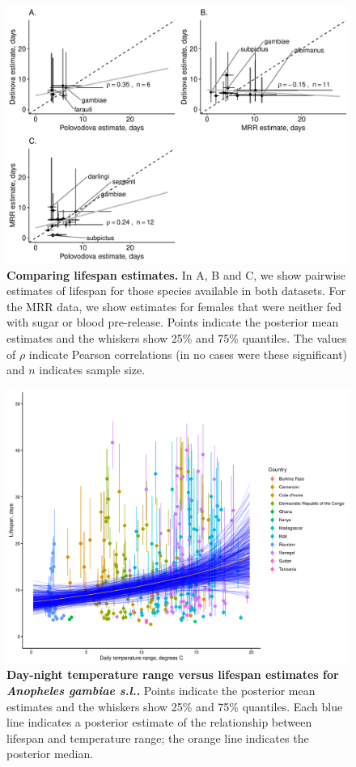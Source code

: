 \documentclass[12pt]{article}
\begin{document}
\begin{figure}[h]
	\centerline{\includegraphics[width=1.3\textwidth]{./Figure_files/pairwise_comparison.pdf}}
	\caption{\textbf{Comparing lifespan estimates.} In A, B and C, we show pairwise estimates of lifespan for those species available in both datasets. For the MRR data, we show estimates for females that were neither fed with sugar or blood pre-release. Points indicate the posterior mean estimates and the whiskers show 25\% and 75\% quantiles. The values of $\rho$ indicate Pearson correlations (in no cases were these significant) and $n$ indicates sample size.}
	\label{fig:comparison}
\end{figure}

\begin{figure}[h]
	\centerline{\includegraphics[width=1.3\textwidth]{./Figure_files/detinova_gambiae_daynight_range_lifespan_country.pdf}}
	\caption{\textbf{Day-night temperature range versus lifespan estimates for \textit{Anopheles gambiae s.l.}.} Points indicate the posterior mean estimates and the whiskers show 25\% and 75\% quantiles. Each blue line indicates a posterior estimate of the relationship between lifespan and temperature range; the orange line indicates the posterior median.}
	\label{fig:detinova_gambiae_daynight_range_lifespan_country}
\end{figure}
\end{document}
